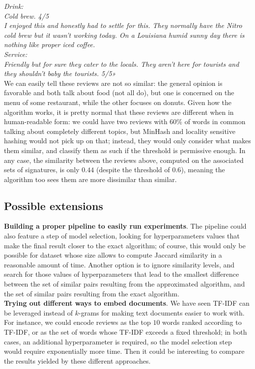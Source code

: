\documentclass{article}
\begin{document}
  \textit{Drink:} \\
  \textit{Cold brew. 4/5} \\
  \textit{I enjoyed this and honestly had to settle for this. They normally
  have the Nitro cold brew but it wasn't working today. On a Louisiana humid
  sunny day there is nothing like proper iced coffee.} \\

  \textit{Service:} \\
  \textit{Friendly but for sure they cater to the locals. They aren't here for
  tourists and they shouldn't baby the tourists. 5/5»} \\

  We can easily tell these reviews are not so similar: the general opinion is
  favorable and both talk about food (not all do), but one is concerned on the
  menu of some restaurant, while the other focuses on donuts. Given how the
  algorithm works, it is pretty normal that these reviews are different when in
  human-readable form: we could have two reviews with \( 60\% \) of words in
  common talking about completely different topics, but MinHash and locality
  sensitive hashing would not pick up on that; instead, they would only
  consider what makes them similar, and classify them as such if the threshold
  is permissive enough. In any case, the similarity between the reviews above,
  computed on the associated sets of signatures, is only \( 0.44 \) (despite
  the threshold of \( 0.6 \)), meaning the algorithm too sees them are more
  dissimilar than similar.

  \subsection*{Possible extensions}
  \textbf{Building a proper pipeline to easily run experiments}. The pipeline
  could also feature a step of model selection, looking for hyperparameters
  values that make the final result closer to the exact algorithm; of course,
  this would only be possible for dataset whose size allows to compute Jaccard
  similarity in a reasonable amount of time. Another option is to ignore
  similarity levels, and search for those values of hyperparameters that lead
  to the smallest difference between the set of similar pairs resulting from
  the approximated algorithm, and the set of similar pairs resulting from the
  exact algorithm. \\
  \textbf{Trying out different ways to embed documents}. We have seen TF-IDF
  can be leveraged instead of \( k \)-grams for making text documents easier to
  work with. For instance, we could encode reviews as the top \( 10 \) words
  ranked according to TF-IDF, or as the set of words whose TF-IDF exceeds a
  fixed threshold; in both cases, an additional hyperparameter is required, so
  the model selection step would require exponentially more time. Then it could
  be interesting to compare the results yielded by these different approaches.
\end{document}

